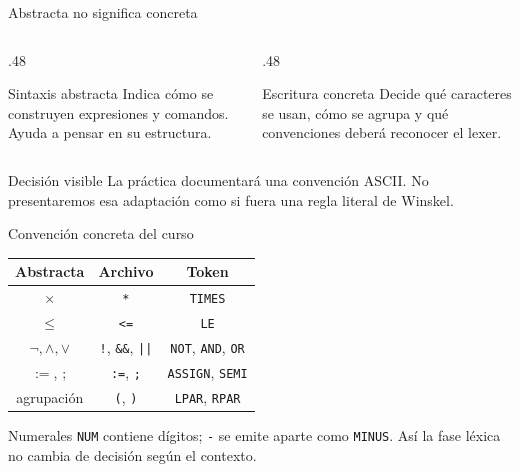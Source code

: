 \documentclass[11pt,spanish]{beamer}
\begin{document}
\begin{frame}{Abstracta no significa concreta}
\vfill

\begin{columns}[T,onlytextwidth]
\begin{column}{.48\textwidth}
\begin{block}{Sintaxis abstracta}
Indica cómo se construyen expresiones y comandos. Ayuda a pensar en su estructura.
\end{block}
\end{column}
\begin{column}{.48\textwidth}
\begin{block}{Escritura concreta}
Decide qué caracteres se usan, cómo se agrupa y qué convenciones deberá reconocer el lexer.
\end{block}
\end{column}
\end{columns}

\bigskip

\begin{alertblock}{Decisión visible}
La práctica documentará una convención ASCII. No presentaremos esa adaptación como si fuera una regla literal de Winskel.
\end{alertblock}

\vfill
\end{frame}

\begin{frame}{Convención concreta del curso}
\vfill

\begin{center}
\small
\renewcommand{\arraystretch}{1.28}
\begin{tabular}{|c|c|c|}
\hline
\textbf{Abstracta} & \textbf{Archivo} & \textbf{Token} \\
\hline
\(\times\) & \texttt{*} & \texttt{TIMES} \\
\hline
\(\leq\) & \texttt{<=} & \texttt{LE} \\
\hline
\(\neg,\land,\lor\) & \texttt{!}, \texttt{\&\&}, \texttt{||} & \texttt{NOT}, \texttt{AND}, \texttt{OR} \\
\hline
\(:=\), \(;\) & \texttt{:=}, \texttt{;} & \texttt{ASSIGN}, \texttt{SEMI} \\
\hline
agrupación & \texttt{(}, \texttt{)} & \texttt{LPAR}, \texttt{RPAR} \\
\hline
\end{tabular}
\end{center}

\bigskip

\begin{block}{Numerales}
\texttt{NUM} contiene dígitos; \texttt{-} se emite aparte como \texttt{MINUS}. Así la fase léxica no cambia de decisión según el contexto.
\end{block}

\vfill
\end{frame}
\end{document}
